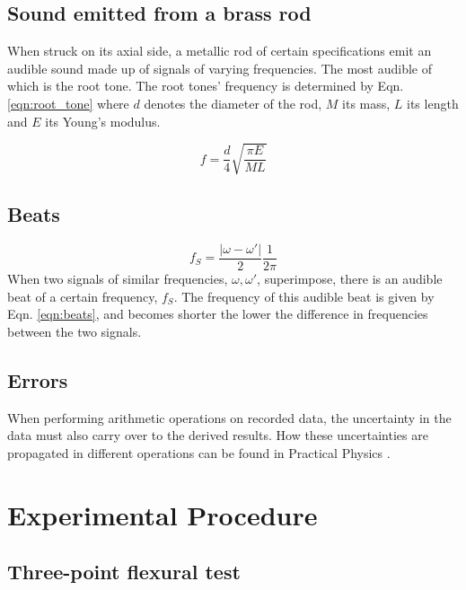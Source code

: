 \documentclass[11pt,a4paper]{article}
\begin{document}
  \subsection{Sound emitted from a brass rod}

  When struck on its axial side, a metallic rod of certain specifications emit an audible sound made up of signals of varying frequencies. The most audible of which is the root tone. The root tones' frequency is determined by Eqn. \ref{eqn:root_tone} where $d$ denotes the diameter of the rod, $M$ its mass, $L$ its length and $E$ its Young's modulus.

  \begin{equation}
    f = \frac{d}{4}\sqrt{\frac{\pi E}{M L}}
    \label{eqn:root_tone}
  \end{equation}

  \subsection{Beats}
    \begin{equation}
      f_S = \frac{|\omega - \omega'|}{2}\frac{1}{2\pi}
      \label{eqn:beats}
    \end{equation}
    When two signals of similar frequencies, $\omega, \omega'$, superimpose, there is an audible beat of a certain frequency, $f_S$. The frequency of this audible beat is given by Eqn. \ref{eqn:beats}, and becomes shorter the lower the difference in frequencies between the two signals.

  \subsection{Errors}
    When performing arithmetic operations on recorded data, the uncertainty in the data must also carry over to the derived results. How these uncertainties are propagated in different operations can be found in Practical Physics \cite{squires}.


\section{\label{section:experimental}Experimental Procedure}
  \subsection{Three-point flexural test}
\end{document}
